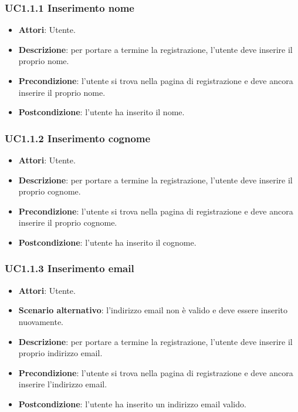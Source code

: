 \subsubsection{UC1.1.1 Inserimento nome}
\begin{itemize}
\item \textbf{Attori}: Utente.
\item \textbf{Descrizione}: per portare a termine la registrazione, l'utente deve inserire il proprio nome.
\item \textbf{Precondizione}: l'utente si trova nella pagina di registrazione e deve ancora inserire il proprio nome.
\item \textbf{Postcondizione}: l'utente ha inserito il nome.
\end{itemize}
\subsubsection{UC1.1.2 Inserimento cognome}
\begin{itemize}
\item \textbf{Attori}: Utente.
\item \textbf{Descrizione}: per portare a termine la registrazione, l'utente deve inserire il proprio cognome.
\item \textbf{Precondizione}: l'utente si trova nella pagina di registrazione e deve ancora inserire il proprio cognome.
\item \textbf{Postcondizione}: l'utente ha inserito il cognome.
\end{itemize}
\subsubsection{UC1.1.3 Inserimento email}
\begin{itemize}
\item \textbf{Attori}: Utente.
\item \textbf{Scenario alternativo}: l'indirizzo email non è valido e deve essere inserito nuovamente.
\item \textbf{Descrizione}: per portare a termine la registrazione, l'utente deve inserire il proprio indirizzo email.
\item \textbf{Precondizione}: l'utente si trova nella pagina di registrazione e deve ancora inserire l'indirizzo email.
\item \textbf{Postcondizione}: l'utente ha inserito un indirizzo email valido.
\end{itemize}

